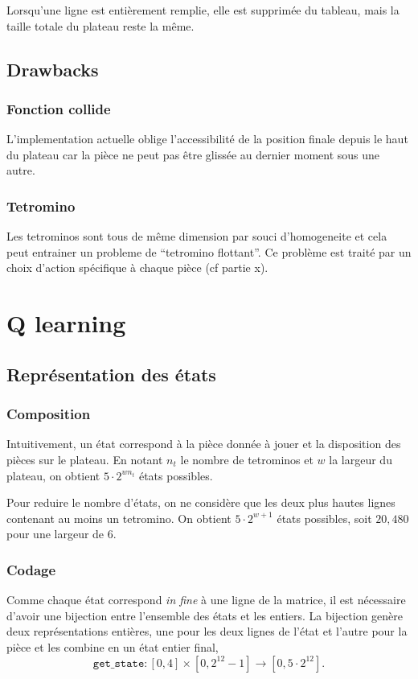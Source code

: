 \documentclass{article}
\begin{document}
Lorsqu'une ligne est entièrement remplie, elle est supprimée du tableau, mais
la taille totale du plateau reste la même.

\subsection{Drawbacks}
\subsubsection{Fonction collide}
L'implementation actuelle oblige l'accessibilit\'e de la position finale depuis
le haut du plateau car la pi\`ece ne peut pas \^etre gliss\'ee au dernier moment
sous une autre.
\subsubsection{Tetromino}
Les tetrominos sont tous de même dimension par souci d'homogeneite et cela
peut entrainer un probleme de ``tetromino flottant''. Ce problème est traité par
un choix d'action spécifique à chaque pièce (cf partie x).
\section{Q learning}

\subsection{Représentation des états}
\subsubsection{Composition}
Intuitivement, un état correspond à la pièce donnée à jouer et la disposition
des pièces sur le plateau. En notant \(n_t\) le nombre de tetrominos et \(w\) la
largeur du plateau, on obtient \(5 \cdot 2^{wn_t}\) états possibles.

Pour reduire le nombre d'états, on ne considère que les deux plus hautes lignes
contenant au moins un tetromino. On obtient \(5\cdot 2^{w+1}\) états possibles,
soit \(20,480\) pour une largeur de 6.

\subsubsection{Codage}
Comme chaque état correspond \textit{in fine} à une ligne de la matrice, il est
nécessaire d'avoir une bijection entre l'ensemble des états et les entiers. La
bijection genère deux représentations entières, une pour les deux lignes de
l'état et l'autre pour la pièce et les combine en un état entier final,
\[
  \texttt{get\_state}\colon [0,4]\times [0, 2^{12} - 1] \to [0, 5\cdot 2^{12}].
\]
\end{document}
